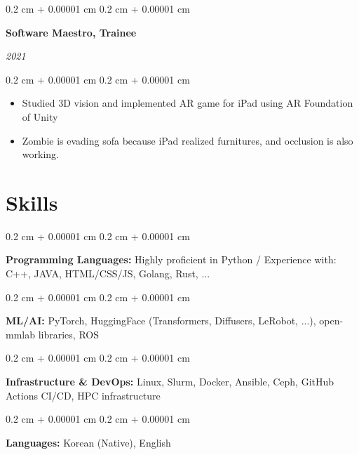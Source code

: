 \documentclass[10pt, letterpaper]{article}
\newenvironment{highlights}{
    \begin{itemize}[
        topsep=0.10 cm,
        parsep=0.10 cm,
        partopsep=0pt,
        itemsep=0pt,
        leftmargin=0.4 cm + 10pt
    ]
}{
    \end{itemize}
} %
\newenvironment{onecolentry}{
    \begin{adjustwidth}{
        0.2 cm + 0.00001 cm
    }{
        0.2 cm + 0.00001 cm
    }
}{
    \end{adjustwidth}
} %
\newenvironment{twocolentry}[2][]{
    \onecolentry
    \def\secondColumn{#2}
    \setcolumnwidth{\fill, 4.5 cm}
    \begin{paracol}{2}
}{
    \switchcolumn \raggedleft \secondColumn
    \end{paracol}
    \endonecolentry
} %
\let\hrefWithoutArrow\href
\renewcommand{\href}[2]{\hrefWithoutArrow{#1}{\ifthenelse{\equal{#2}{}}{ }{#2 }\raisebox{.15ex}{\footnotesize \faExternalLink*}}}
\begin{document}
\vspace{0.2 cm}

\begin{twocolentry}{
        \textit{2021}
    }
    \textbf{Software Maestro, Trainee}
\end{twocolentry}

\vspace{0.10 cm}
\begin{onecolentry}
    \begin{highlights}
        \item Studied 3D vision and implemented AR game for iPad using AR Foundation of Unity
        \item Zombie is evading sofa because iPad realized furnitures, and occlusion is also working. \href{https://bit.ly/3Vxw8Ls}{[link]}
    \end{highlights}
\end{onecolentry}

\section{Skills}

\begin{onecolentry}
    \textbf{Programming Languages:} Highly proficient in Python / Experience with: C++, JAVA, HTML/CSS/JS, Golang, Rust, ...
\end{onecolentry}

\vspace{0.2 cm}

\begin{onecolentry}
    \textbf{ML/AI:} PyTorch, HuggingFace (Transformers, Diffusers, LeRobot, ...), open-mmlab libraries, ROS
\end{onecolentry}

\vspace{0.2 cm}

\begin{onecolentry}
    \textbf{Infrastructure \& DevOps:} Linux, Slurm, Docker, Ansible, Ceph, GitHub Actions CI/CD, HPC infrastructure
\end{onecolentry}

\vspace{0.2 cm}

\begin{onecolentry}
    \textbf{Languages:} Korean (Native), English
\end{onecolentry}
\end{document}
